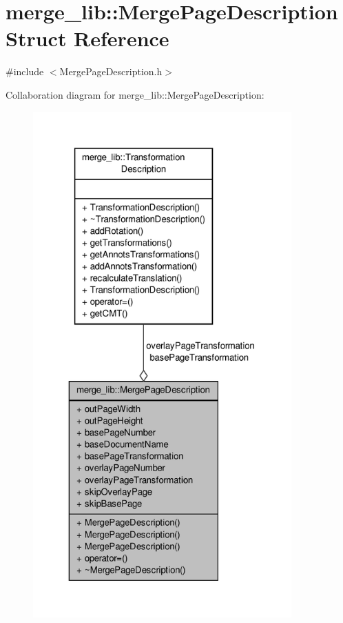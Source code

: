 \hypertarget{structmerge__lib_1_1_merge_page_description}{\section{merge\-\_\-lib\-:\-:Merge\-Page\-Description Struct Reference}
\label{d0/dff/structmerge__lib_1_1_merge_page_description}
}


{\ttfamily \#include $<$Merge\-Page\-Description.\-h$>$}



Collaboration diagram for merge\-\_\-lib\-:\-:Merge\-Page\-Description\-:
\nopagebreak
\begin{figure}[H]
\begin{center}
\leavevmode
\includegraphics[height=550pt]{d2/d4d/structmerge__lib_1_1_merge_page_description__coll__graph}
\end{center}
\end{figure}
